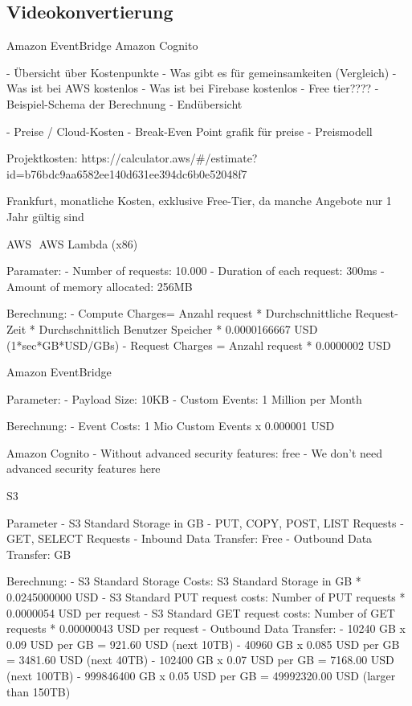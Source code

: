 \begin{description}
\subsection{Videokonvertierung}


Amazon EventBridge
Amazon Cognito










- Übersicht über Kostenpunkte
  - Was gibt es für gemeinsamkeiten (Vergleich)
  - Was ist bei AWS kostenlos
  - Was ist bei Firebase kostenlos
  - Free tier????
  - Beispiel-Schema der Berechnung
  - Endübersicht

- Preise / Cloud-Kosten
  - Break-Even Point grafik für preise
  - Preismodell



  Projektkosten:
  https://calculator.aws/#/estimate?id=b76bdc9aa6582ee140d631ee394dc6b0e52048f7

  Frankfurt, monatliche Kosten, exklusive Free-Tier, da manche Angebote nur 1 Jahr gültig sind

  AWS
 AWS Lambda (x86)

  Paramater:
  - Number of requests: 10.000
  - Duration of each request: 300ms
  - Amount of memory allocated: 256MB

  Berechnung:
  - Compute Charges= Anzahl request * Durchschnittliche Request-Zeit * Durchschnittlich Benutzer Speicher * 0.0000166667 USD (1*sec*GB*USD/GBs)
  - Request Charges = Anzahl request * 0.0000002 USD

  Amazon EventBridge

  Parameter:
  - Payload Size: 10KB
  - Custom Events: 1 Million per Month

  Berechnung:
  - Event Costs: 1 Mio Custom Events x 0.000001 USD

  Amazon Cognito
  - Without advanced security features: free
  - We don’t need advanced security features here

  S3

  Parameter
  - S3 Standard Storage in GB
  - PUT, COPY, POST, LIST Requests
  - GET, SELECT Requests
  - Inbound Data Transfer: Free
  - Outbound Data Transfer: GB

  Berechnung:
  - S3 Standard Storage Costs: S3 Standard Storage in GB * 0.0245000000 USD
  - S3 Standard PUT request costs: Number of PUT requests * 0.0000054 USD per request
  - S3 Standard GET request costs: Number of GET requests * 0.00000043 USD per request
  - Outbound Data Transfer:
      - 10240 GB x 0.09 USD per GB = 921.60 USD (next 10TB)
      - 40960 GB x 0.085 USD per GB = 3481.60 USD (next 40TB)
      - 102400 GB x 0.07 USD per GB = 7168.00 USD (next 100TB)
      - 999846400 GB x 0.05 USD per GB = 49992320.00 USD (larger than 150TB)


\end{description}
